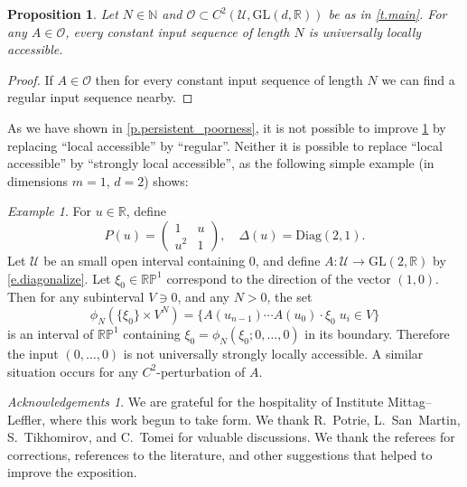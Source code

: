 \documentclass[10pt, a4paper]{amsart}
\theoremstyle{plain}
\newtheorem{prop}[lemma]{Proposition}
\theoremstyle{definition}
\theoremstyle{remark}
\newtheorem*{ack}{Acknowledgements}
\theoremstyle{note}
\newtheorem{example}[lemma]{Example}
\numberwithin{equation}{section}
\begin{document}
\begin{prop}\label{p.local acc}
Let $N \in {\mathbb{N}}$ and ${\mathcal{O}} \subset C^2({\mathcal{U}},{\mathrm{GL}}(d,{\mathbb{R}}))$ be as in \cref{t.main}.
For any $A \in {\mathcal{O}}$, every constant input sequence of length $N$ is universally locally accessible.
\end{prop}

\begin{proof}
If $A\in {\mathcal{O}}$ then for every constant input sequence of length $N$
we can find a regular input sequence nearby.
\end{proof}

As we have shown in \cref{p.persistent_poorness}, 
it is not possible to improve \cref{p.local acc} by replacing ``local accessible'' by ``regular''.
Neither it is possible to replace ``local accessible'' by ``strongly local accessible'',
as the following simple example (in dimensions $m=1$, $d=2$) shows:

\begin{example}
For $u \in {\mathbb{R}}$, define
$$
P(u) = \begin{pmatrix} 1 & u \\ u^2 & 1 \end{pmatrix}, \quad \Delta(u) = {\mathrm{Diag}}(2,1).
$$
Let ${\mathcal{U}}$ be an small open interval containing $0$,
and define $A \colon {\mathcal{U}} \to {\mathrm{GL}}(2,{\mathbb{R}})$ by \eqref{e.diagonalize}.
Let $\xi_0 \in {\mathbb{R}}{\mathbb{P}}^1$ correspond to the direction of the vector $(1,0)$.
Then for any subinterval $V \ni 0$, and any $N>0$, the set 
$$
\phi_N (\{\xi_0\} \times V^N) = \big\{ A(u_{n-1})\cdots A(u_0)\cdot \xi_0 \; u_i \in V \big\}
$$
is an interval of ${\mathbb{R}}{\mathbb{P}}^1$ containing $\xi_0 = \phi_N (\xi_0; 0,\dots,0)$ in its boundary.
Therefore the input $(0,\dots,0)$ is not universally strongly locally accessible.
A similar situation occurs for any $C^2$-perturbation of $A$.
\end{example}

\bigskip

\begin{ack}
We are grateful for the hospitality of Institute Mittag--Leffler, 
where this work begun to take form.
We thank R.~Potrie, L.~San~Martin, S.~Tikhomirov, and C.~Tomei for valuable discussions.
We thank the referees for corrections, references to the literature,
and other suggestions that helped to improve the exposition.
\end{ack}
\end{document}
